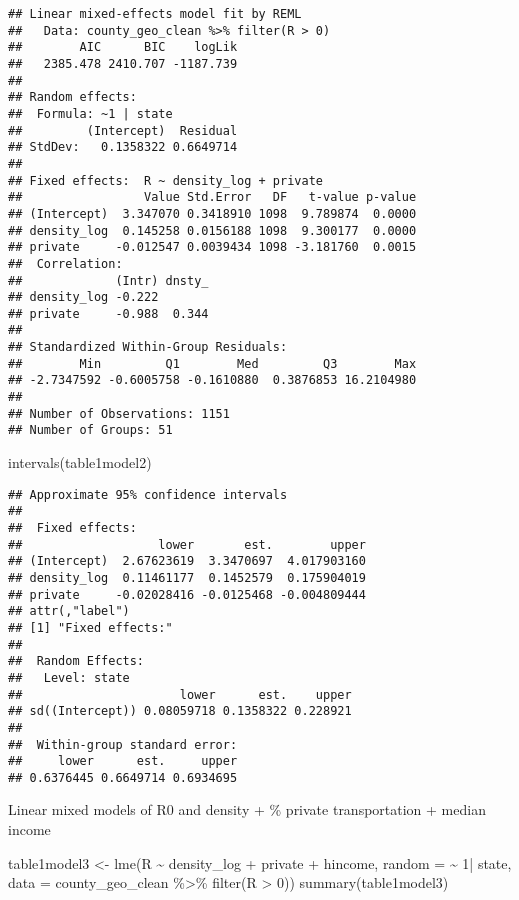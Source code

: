 \documentclass[10pt,letterpaper]{article}
\newenvironment{Shaded}{\begin{snugshade}}{\end{snugshade}}
\newcommand{\AttributeTok}[1]{\textcolor[rgb]{0.77,0.63,0.00}{#1}}
\newcommand{\DecValTok}[1]{\textcolor[rgb]{0.00,0.00,0.81}{#1}}
\newcommand{\FunctionTok}[1]{\textcolor[rgb]{0.00,0.00,0.00}{#1}}
\newcommand{\NormalTok}[1]{#1}
\newcommand{\OtherTok}[1]{\textcolor[rgb]{0.56,0.35,0.01}{#1}}
\newcommand{\SpecialCharTok}[1]{\textcolor[rgb]{0.00,0.00,0.00}{#1}}
\begin{document}
\begin{verbatim}
## Linear mixed-effects model fit by REML
##   Data: county_geo_clean %>% filter(R > 0) 
##        AIC      BIC    logLik
##   2385.478 2410.707 -1187.739
## 
## Random effects:
##  Formula: ~1 | state
##         (Intercept)  Residual
## StdDev:   0.1358322 0.6649714
## 
## Fixed effects:  R ~ density_log + private 
##                 Value Std.Error   DF   t-value p-value
## (Intercept)  3.347070 0.3418910 1098  9.789874  0.0000
## density_log  0.145258 0.0156188 1098  9.300177  0.0000
## private     -0.012547 0.0039434 1098 -3.181760  0.0015
##  Correlation: 
##             (Intr) dnsty_
## density_log -0.222       
## private     -0.988  0.344
## 
## Standardized Within-Group Residuals:
##        Min         Q1        Med         Q3        Max 
## -2.7347592 -0.6005758 -0.1610880  0.3876853 16.2104980 
## 
## Number of Observations: 1151
## Number of Groups: 51
\end{verbatim}

\begin{Shaded}
\begin{Highlighting}[]
\FunctionTok{intervals}\NormalTok{(table1model2)}
\end{Highlighting}
\end{Shaded}

\begin{verbatim}
## Approximate 95% confidence intervals
## 
##  Fixed effects:
##                   lower       est.        upper
## (Intercept)  2.67623619  3.3470697  4.017903160
## density_log  0.11461177  0.1452579  0.175904019
## private     -0.02028416 -0.0125468 -0.004809444
## attr(,"label")
## [1] "Fixed effects:"
## 
##  Random Effects:
##   Level: state 
##                      lower      est.    upper
## sd((Intercept)) 0.08059718 0.1358322 0.228921
## 
##  Within-group standard error:
##     lower      est.     upper 
## 0.6376445 0.6649714 0.6934695
\end{verbatim}

Linear mixed models of R0 and density + \% private transportation +
median income

\begin{Shaded}
\begin{Highlighting}[]
\NormalTok{table1model3 }\OtherTok{\textless{}{-}} \FunctionTok{lme}\NormalTok{(R }\SpecialCharTok{\textasciitilde{}}\NormalTok{ density\_log }\SpecialCharTok{+}\NormalTok{ private }\SpecialCharTok{+}\NormalTok{ hincome, }
                    \AttributeTok{random =} \SpecialCharTok{\textasciitilde{}} \DecValTok{1}\SpecialCharTok{|}\NormalTok{ state, }
                    \AttributeTok{data =}\NormalTok{ county\_geo\_clean }\SpecialCharTok{\%\textgreater{}\%}
                      \FunctionTok{filter}\NormalTok{(R }\SpecialCharTok{\textgreater{}} \DecValTok{0}\NormalTok{))}
\FunctionTok{summary}\NormalTok{(table1model3)}
\end{Highlighting}
\end{Shaded}
\end{document}
